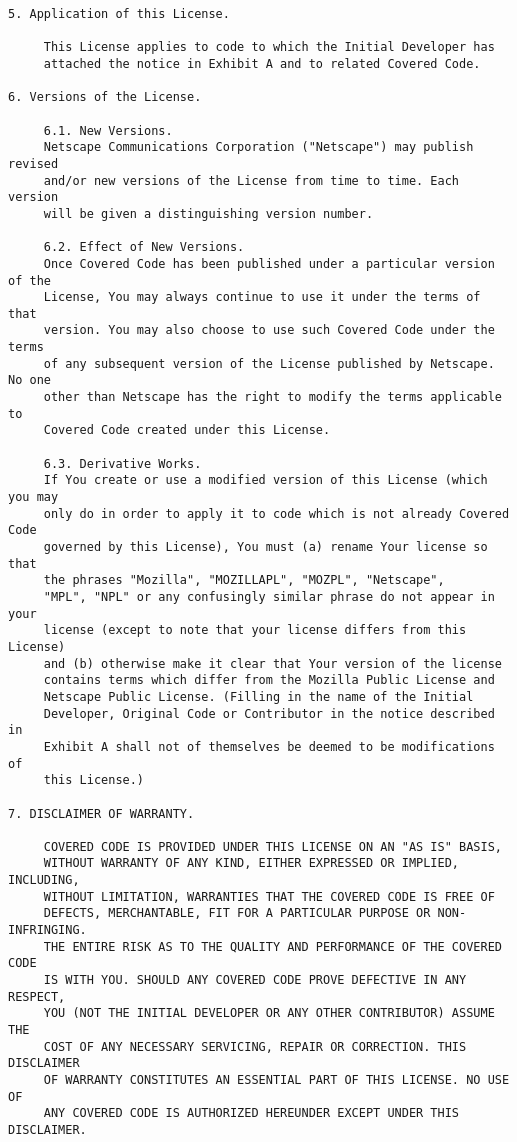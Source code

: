 \begin{verbatim}
5. Application of this License.

     This License applies to code to which the Initial Developer has
     attached the notice in Exhibit A and to related Covered Code.

6. Versions of the License.

     6.1. New Versions.
     Netscape Communications Corporation ("Netscape") may publish revised
     and/or new versions of the License from time to time. Each version
     will be given a distinguishing version number.

     6.2. Effect of New Versions.
     Once Covered Code has been published under a particular version of the
     License, You may always continue to use it under the terms of that
     version. You may also choose to use such Covered Code under the terms
     of any subsequent version of the License published by Netscape. No one
     other than Netscape has the right to modify the terms applicable to
     Covered Code created under this License.

     6.3. Derivative Works.
     If You create or use a modified version of this License (which you may
     only do in order to apply it to code which is not already Covered Code
     governed by this License), You must (a) rename Your license so that
     the phrases "Mozilla", "MOZILLAPL", "MOZPL", "Netscape",
     "MPL", "NPL" or any confusingly similar phrase do not appear in your
     license (except to note that your license differs from this License)
     and (b) otherwise make it clear that Your version of the license
     contains terms which differ from the Mozilla Public License and
     Netscape Public License. (Filling in the name of the Initial
     Developer, Original Code or Contributor in the notice described in
     Exhibit A shall not of themselves be deemed to be modifications of
     this License.)

7. DISCLAIMER OF WARRANTY.

     COVERED CODE IS PROVIDED UNDER THIS LICENSE ON AN "AS IS" BASIS,
     WITHOUT WARRANTY OF ANY KIND, EITHER EXPRESSED OR IMPLIED, INCLUDING,
     WITHOUT LIMITATION, WARRANTIES THAT THE COVERED CODE IS FREE OF
     DEFECTS, MERCHANTABLE, FIT FOR A PARTICULAR PURPOSE OR NON-INFRINGING.
     THE ENTIRE RISK AS TO THE QUALITY AND PERFORMANCE OF THE COVERED CODE
     IS WITH YOU. SHOULD ANY COVERED CODE PROVE DEFECTIVE IN ANY RESPECT,
     YOU (NOT THE INITIAL DEVELOPER OR ANY OTHER CONTRIBUTOR) ASSUME THE
     COST OF ANY NECESSARY SERVICING, REPAIR OR CORRECTION. THIS DISCLAIMER
     OF WARRANTY CONSTITUTES AN ESSENTIAL PART OF THIS LICENSE. NO USE OF
     ANY COVERED CODE IS AUTHORIZED HEREUNDER EXCEPT UNDER THIS DISCLAIMER.


\end{verbatim}

